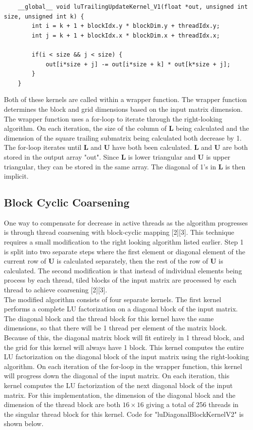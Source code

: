 \documentclass{article}
\begin{document}
\begin{verbatim}
	__global__ void luTrailingUpdateKernel_V1(float *out, unsigned int size, unsigned int k) {
		int i = k + 1 + blockIdx.y * blockDim.y + threadIdx.y;
		int j = k + 1 + blockIdx.x * blockDim.x + threadIdx.x;
		
		if(i < size && j < size) {
			out[i*size + j] -= out[i*size + k] * out[k*size + j];
		}
	}
\end{verbatim}

Both of these kernels are called within a wrapper function. The wrapper function determines the block and grid dimensions based on the input matrix dimension. The wrapper function uses a for-loop to iterate through the right-looking algorithm. On each iteration, the size of the column of $\mathbf{L}$ being calculated and the dimension of the square trailing submatrix being calculated both decrease by 1. The for-loop iterates until $\mathbf{L}$ and $\mathbf{U}$ have both been calculated. $\mathbf{L}$ and $\mathbf{U}$ are both stored in the output array "out". Since $\mathbf{L}$ is lower triangular and $\mathbf{U}$ is upper triangular, they can be stored in the same array. The diagonal of 1's in $\mathbf{L}$ is then implicit.

\subsection{Block Cyclic Coarsening}
One way to compensate for decrease in active threads as the algorithm progresses is through thread coarsening with block-cyclic mapping [2][3]. This technique requires a small modification to the right looking algorithm listed earlier. Step 1 is split into two separate steps where the first element or diagonal element of the current row of $\mathbf{U}$ is calculated separately, then the rest of the row of $\mathbf{U}$ is calculated. The second modification is that instead of individual elements being process by each thread, tiled blocks of the input matrix are processed by each thread to achieve coarsening [2][3]. \\

The modified algorithm consists of four separate kernels. The first kernel performs a complete LU factorization on a diagonal block of the input matrix. The diagonal block and the thread block for this kernel have the same dimensions, so that there will be 1 thread per element of the matrix block. Because of this, the diagonal matrix block will fit entirely in 1 thread block, and the grid for this kernel will always have 1 block. This kernel computes the entire LU factorization on the diagonal block of the input matrix using the right-looking algorithm. On each iteration of the for-loop in the wrapper function, this kernel will progress down the diagonal of the input matrix. On each iteration, this kernel computes the LU factorization of the next diagonal block of the input matrix. For this implementation, the dimension of the diagonal block and the dimension of the thread block are both $16\times 16$ giving a total of 256 threads in the singular thread block for this kernel. Code for "luDiagonalBlockKernel\textunderscore V2" is shown below.
\end{document}
